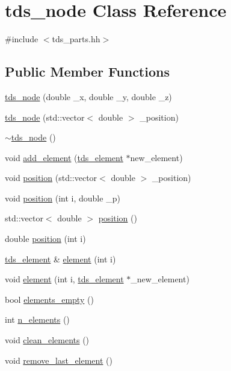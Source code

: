 \hypertarget{classtds__node}{\section{tds\-\_\-node Class Reference}
\label{classtds__node}
}


{\ttfamily \#include $<$tds\-\_\-parts.\-hh$>$}

\subsection*{Public Member Functions}
\begin{DoxyCompactItemize}
\item 
\hyperlink{classtds__node_aae4e896d901f88ab725df449454412e4}{tds\-\_\-node} (double \-\_\-x, double \-\_\-y, double \-\_\-z)
\item 
\hyperlink{classtds__node_ad485694533fbe32047035cf9c4ffca48}{tds\-\_\-node} (std\-::vector$<$ double $>$ \-\_\-position)
\item 
\hyperlink{classtds__node_afd27a4e35834832cb923db673ee4b3ee}{$\sim$tds\-\_\-node} ()
\item 
void \hyperlink{classtds__node_a678be3112890f9998796c2c7033e2e91}{add\-\_\-element} (\hyperlink{classtds__element}{tds\-\_\-element} $\ast$new\-\_\-element)
\item 
void \hyperlink{classtds__node_a6967a1b6824ff0cb64c901746994a9a2}{position} (std\-::vector$<$ double $>$ \-\_\-position)
\item 
void \hyperlink{classtds__node_a8cf9300cdb4b20bbebf9a2f04b37695f}{position} (int i, double \-\_\-p)
\item 
std\-::vector$<$ double $>$ \hyperlink{classtds__node_ac4fbb78ffb5d7c27384c9ca0bb16f39e}{position} ()
\item 
double \hyperlink{classtds__node_ab9fc6244a5657f8bd6eaea8bf86f0346}{position} (int i)
\item 
\hyperlink{classtds__element}{tds\-\_\-element} \& \hyperlink{classtds__node_ae0efbd59681b496e53ee685e1b7d59a6}{element} (int i)
\item 
void \hyperlink{classtds__node_a9d329513511f86cc828792e4eff4c3e7}{element} (int i, \hyperlink{classtds__element}{tds\-\_\-element} $\ast$\-\_\-new\-\_\-element)
\item 
bool \hyperlink{classtds__node_a285d91e52abf56986f50a91e615cf9f5}{elements\-\_\-empty} ()
\item 
int \hyperlink{classtds__node_a4066ea71ef3ea4329c82aef6ee0ff41a}{n\-\_\-elements} ()
\item 
void \hyperlink{classtds__node_a7fd1af280d8db87fa3a1c4942f54420c}{clean\-\_\-elements} ()
\item 
void \hyperlink{classtds__node_a9659601fc4789ccaad501018f864dc2a}{remove\-\_\-last\-\_\-element} ()
\end{DoxyCompactItemize}


